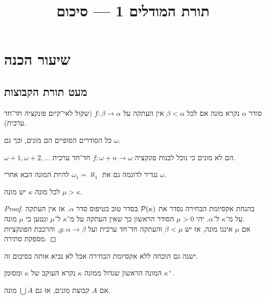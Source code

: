 
\title{תורת המודלים 1 --- סיכום}
\setcounter{secnumdepth}{2}

\usepackage{fancyhdr}
\pagestyle{fancy}
\renewcommand{\headrulewidth}{0pt}


\maketitle
\maketitleprint[purple]

\tableofcontents

\setcounter{section}{-1}
\section{שיעור הכנה}
\subsection{מעט תורת הקבוצות}
\begin{definition}[מונה]
	סודר $\alpha$ נקרא מונה אם לכל $\beta < \alpha$ אין העתקה על $f : \beta \to \alpha$ (שקול לאי־קיום פונקציה חד־חד ערכית).
\end{definition}
\begin{example}
	כל הסודרים הסופיים הם מונים, וכך גם $\omega$.
\end{example}
\begin{example} 
	$\omega + 1, \omega + 2, \ldots$ הם לא מונים כי נוכל לבנות פונקציה $f : \omega + n \to \omega$ חד־חד ערכית.
\end{example}
נגדיר לדוגמה גם את $\omega_1 = \aleph_1$ להיות המונה הבא אחרי $\omega$.
\begin{theorem}
	לכל מונה $\kappa$ יש מונה $\mu > \kappa$.
\end{theorem}
\begin{proof}
	בהנחת אקסיומת הבחירה נסדר את $\mathcal{P}(\kappa)$ בסדר טוב בטיפוס סדר $\alpha$.
	אז אין העתקה על מ־$\kappa$ ל־$\alpha$.
	יהי $\mu > 0$ הסודר הראשון כך שאין העתקה על מ־$\kappa$ ל־$\mu$ ונטען כי $\mu$ מונה. \\
	אם $\mu$ איננו מונה, אז יש $\beta < \mu$ והעתקה חד־חד ערכית ועל $g : \alpha \to \beta$, והרכבת הפונקציות מספקת סתירה.
\end{proof}
ישנה גם הוכחה ללא אקסיומת הבחירה אבל לא נביא אותה בסיכום זה.
\begin{definition}
	המונה הראשון שגדול ממונה $\kappa$ נקרא העוקב של $\kappa$ ומסומן $\kappa^+$.
\end{definition}
\begin{remark}
	אם $A$ קבוצת מונים, אז גם $\bigcup A$ מונה.
\end{remark}
